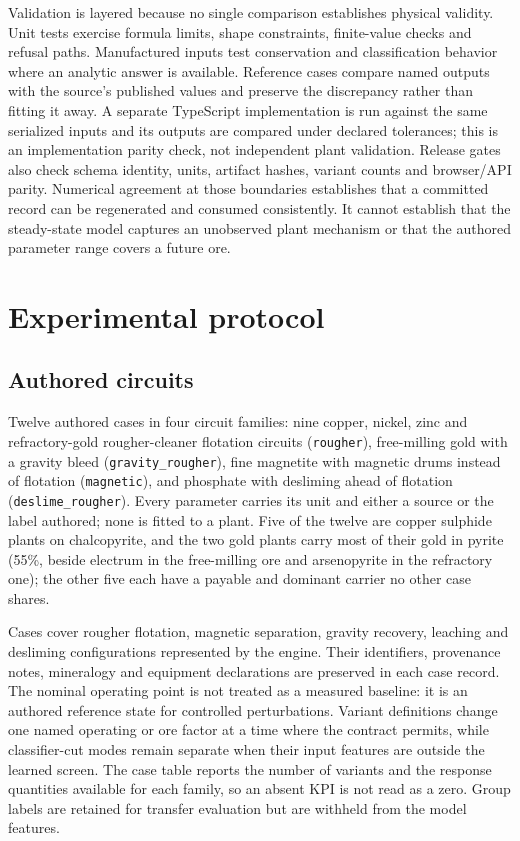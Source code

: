\documentclass[10pt]{article}
\begin{document}
Validation is layered because no single comparison establishes physical
validity. Unit tests exercise formula limits, shape constraints,
finite-value checks and refusal paths. Manufactured inputs test
conservation and classification behavior where an analytic answer is
available. Reference cases compare named outputs with the source's
published values and preserve the discrepancy rather than fitting it
away. A separate TypeScript implementation is run against the same
serialized inputs and its outputs are compared under declared
tolerances; this is an implementation parity check, not independent
plant validation. Release gates also check schema identity, units,
artifact hashes, variant counts and browser/API parity. Numerical
agreement at those boundaries establishes that a committed record can be
regenerated and consumed consistently. It cannot establish that the
steady-state model captures an unobserved plant mechanism or that the
authored parameter range covers a future ore.

\section{Experimental protocol}\label{experimental-protocol}

\subsection{Authored circuits}\label{authored-circuits}

Twelve authored cases in four circuit families: nine copper, nickel,
zinc and refractory-gold rougher-cleaner flotation circuits
(\texttt{rougher}), free-milling gold with a gravity bleed
(\texttt{gravity\_rougher}), fine magnetite with magnetic drums instead
of flotation (\texttt{magnetic}), and phosphate with desliming ahead of
flotation (\texttt{deslime\_rougher}). Every parameter carries its unit
and either a source or the label authored; none is fitted to a plant.
Five of the twelve are copper sulphide plants on chalcopyrite, and the
two gold plants carry most of their gold in pyrite (55\%, beside
electrum in the free-milling ore and arsenopyrite in the refractory
one); the other five each have a payable and dominant carrier no other
case shares.

Cases cover rougher flotation, magnetic separation, gravity recovery,
leaching and desliming configurations represented by the engine. Their
identifiers, provenance notes, mineralogy and equipment declarations are
preserved in each case record. The nominal operating point is not
treated as a measured baseline: it is an authored reference state for
controlled perturbations. Variant definitions change one named operating
or ore factor at a time where the contract permits, while classifier-cut
modes remain separate when their input features are outside the learned
screen. The case table reports the number of variants and the response
quantities available for each family, so an absent KPI is not read as a
zero. Group labels are retained for transfer evaluation but are withheld
from the model features.
\end{document}
